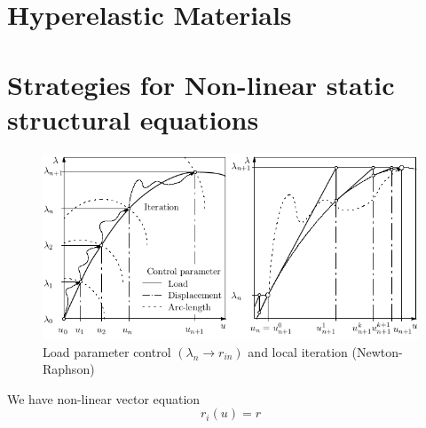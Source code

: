 \section{Hyperelastic Materials \parencite{medium} \parencite{ref4}}


\section{Strategies for Non-linear static structural equations \parencite{Advance} }
\begin{figure}[H]
    \centering
    \includegraphics[scale=0.55]{Figure2/Chap3/local iteration.png}
    \caption{Load parameter control $(\lambda_n \rightarrow r_{in})$ and local iteration (Newton-Raphson)}
    \label{fig:7.1}
\end{figure}
We have non-linear vector equation
\begin{equation}
    \label{eqn:7.1} 
    r_i(u)=r
\end{equation}

